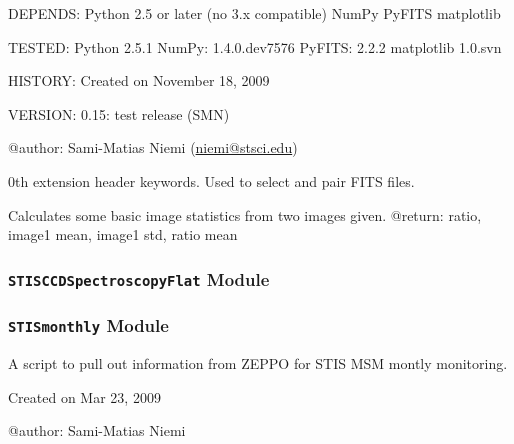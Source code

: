 \documentclass[letterpaper,10pt,english]{sphinxmanual}
\begin{document}
DEPENDS:
Python 2.5 or later (no 3.x compatible)
NumPy
PyFITS
matplotlib

TESTED:
Python 2.5.1
NumPy: 1.4.0.dev7576
PyFITS: 2.2.2
matplotlib 1.0.svn

HISTORY:
Created on November 18, 2009

VERSION:
0.15: test release (SMN)

@author: Sami-Matias Niemi (\href{mailto:niemi@stsci.edu}{niemi@stsci.edu})


\begin{fulllineitems}
\label{SamPy.stis:SamPy.stis.STISCCDImagingFlats.Idetifiers}
0th extension header keywords.
Used to select and pair FITS files.

\end{fulllineitems}



\begin{fulllineitems}
\label{SamPy.stis:SamPy.stis.STISCCDImagingFlats.ImStats}
Calculates some basic image statistics from 
two images given.
@return: ratio, image1 mean, image1 std, ratio mean

\end{fulllineitems}



\subsubsection{\texttt{STISCCDSpectroscopyFlat} Module}
\label{SamPy.stis:stisccdspectroscopyflat-module}

\subsubsection{\texttt{STISmonthly} Module}
\label{SamPy.stis:stismonthly-module}\label{SamPy.stis:module-SamPy.stis.STISmonthly}
A script to pull out information from ZEPPO for STIS MSM montly monitoring.

Created on Mar 23, 2009

@author: Sami-Matias Niemi

\end{document}
